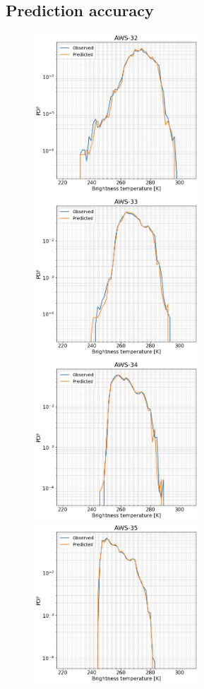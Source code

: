 \documentclass[12pt]{article}
\begin{document}
\subsection{Prediction accuracy}
%
\begin{figure}[!tb]
	\centering
	\includegraphics[height=60mm]{distribution_predicted_C32}\hspace{5mm}%
	\includegraphics[height=60mm]{distribution_predicted_C33}
	\includegraphics[height=60mm]{distribution_predicted_C34}\hspace{5mm}%
	\includegraphics[height=60mm]{distribution_predicted_C35}

\end{figure}
\end{document}

